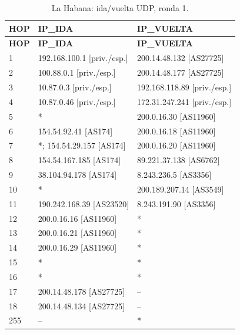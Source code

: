 \begin{longtable}{p{0.95cm}p{7.075cm}p{7.075cm}}
\caption{La Habana: ida/vuelta UDP, ronda 1.}\label{anexo:vuelta:200.14.48.134:UDP:1} \\
\toprule
\textbf{HOP} & \textbf{IP\_\allowbreak{}IDA} & \textbf{IP\_\allowbreak{}VUELTA} \\ \midrule
\endfirsthead
\toprule
\textbf{HOP} & \textbf{IP\_\allowbreak{}IDA} & \textbf{IP\_\allowbreak{}VUELTA} \\ \midrule
\endhead
1 & 192.168.100.1 [priv./esp.] & 200.14.48.132 [AS27725] \\
2 & 100.88.0.1 [priv./esp.] & 200.14.48.177 [AS27725] \\
3 & 10.87.0.3 [priv./esp.] & 192.168.118.89 [priv./esp.] \\
4 & 10.87.0.46 [priv./esp.] & 172.31.247.241 [priv./esp.] \\
5 & * & 200.0.16.30 [AS11960] \\
6 & 154.54.92.41 [AS174] & 200.0.16.18 [AS11960] \\
7 & *; 154.54.29.157 [AS174] & 200.0.16.20 [AS11960] \\
8 & 154.54.167.185 [AS174] & 89.221.37.138 [AS6762] \\
9 & 38.104.94.178 [AS174] & 8.243.236.5 [AS3356] \\
10 & * & 200.189.207.14 [AS3549] \\
11 & 190.242.168.39 [AS23520] & 8.243.191.90 [AS3356] \\
12 & 200.0.16.16 [AS11960] & * \\
13 & 200.0.16.21 [AS11960] & * \\
14 & 200.0.16.29 [AS11960] & * \\
15 & * & * \\
16 & * & * \\
17 & 200.14.48.178 [AS27725] & -- \\
18 & 200.14.48.134 [AS27725] & -- \\
255 & -- & * \\
\bottomrule
\end{longtable}
\endgroup
\begingroup
\fontsize{9}{11}\selectfont
